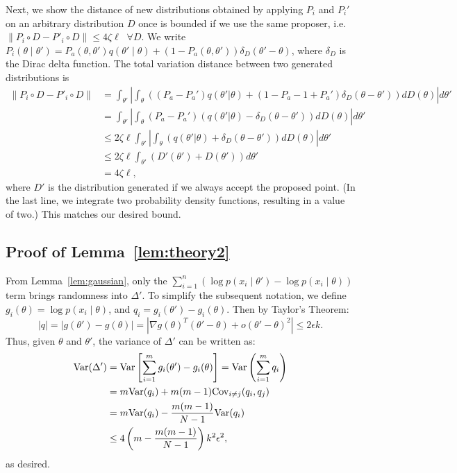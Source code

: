 \documentclass{article}
\begin{document}
Next, we show the distance of new distributions obtained by applying $P_i$ and $P_i'$ on an
arbitrary distribution $D$ once is bounded if we use the same proposer, i.e.  $\|P_i\circ D -
P'_i\circ D\| \leq 4\zeta \ell \;\; \forall D$. We write $P_i(\theta \mid \theta') = P_a(\theta, \theta')
q(\theta'\mid \theta) + (1-P_a(\theta,\theta')) \delta_D(\theta' - \theta)$, where $\delta_D$
is the Dirac delta function. The total variation distance between two generated distributions is
\begin{align*}
\|P_i\circ D - P'_i\circ D\| &= \int_{\theta'} \left| \int_{\theta}((P_a-P_a') q(\theta'|\theta) + (1-P_a - 1+P_a') \delta_D(\theta -\theta')) dD(\theta) \right| d\theta' \\
&= \int_{\theta'} \left| \int_{\theta} (P_a- P_a')(q(\theta'|\theta) - \delta_D(\theta - \theta')) dD(\theta) \right|  d\theta'\\ 
&\leq 2 \zeta \ell \int_{\theta'} \left| \int_{\theta}(q(\theta'|\theta) + \delta_D(\theta - \theta')) dD(\theta) \right| d\theta'\\
&\leq 2 \zeta \ell \int_{\theta'} ( D'(\theta') + D(\theta') ) d\theta'\\
&= 4 \zeta \ell,
\end{align*}
where $D'$ is the distribution generated if we always accept the proposed point. (In the last line,
we integrate two probability density functions, resulting in a value of two.) This matches our
desired bound.

\subsection{Proof of Lemma~\ref{lem:theory2}}\label{app:theory2}

From Lemma~\ref{lem:gaussian}, only the $\sum_{i=1}^n (\log p(x_i\mid \theta') - \log p(x_i\mid
\theta))$ term brings randomness into $\Delta'$. To simplify the subsequent notation, we define
$g_i(\theta) = \log p(x_i\mid \theta)$, and $q_i = g_i(\theta') - g_i(\theta)$. Then by Taylor's Theorem:
\[
|q| = |g(\theta') - g(\theta)| = |\nabla g(\theta)^T(\theta' - \theta) + o(\theta' - \theta)^2| \leq 2\epsilon k.
\]
Thus, given $\theta$ and $\theta'$, the variance of $\Delta'$ can be written as:
\begin{align*}
{\rm Var}(\Delta') &= {\rm Var}\left[\sum_{i=1}^m g_i(\theta') - g_i(\theta)\right] = {\rm Var}\left(\sum_{i=1}^m q_i\right) \\
&= m {\rm Var} (q_i) + m(m-1) {\rm Cov}_{i \neq j}(q_i,q_j) \\
&= m{\rm Var}(q_i) - \frac{m(m-1)}{N-1} {\rm Var}(q_i) \\
&\leq 4\left(m - \frac{m(m-1)}{N-1}\right)k^2 \epsilon^2,
\end{align*}
as desired.
\end{document}
